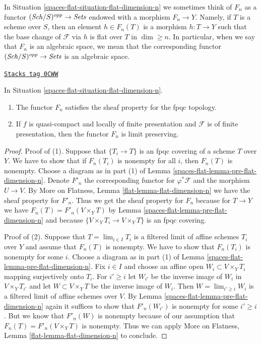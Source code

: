 In Situation \ref{spaces-flat-situation-flat-dimension-n} we sometimes think of
$F_n$ as a functor $(\mathit{Sch}/S)^{opp} \to \textit{Sets}$ endowed with a morphism
$F_n \to Y$. Namely, if $T$ is a scheme over $S$, then
an element $h \in F_n(T)$ is a morphism $h : T \to Y$
such that the base change of $\mathcal{F}$ via $h$ is flat over $T$
in $\dim \geq n$. In particular, when we say
that $F_n$ is an algebraic space, we mean that the corresponding
functor $(\mathit{Sch}/S)^{opp} \to \textit{Sets}$ is an algebraic space.

\begin{lemma}
\label{spaces-flat-lemma-flat-dimension-n}
\href{https://stacks.math.columbia.edu/tag/0CWW}{\texttt{Stacks tag 0CWW}}

In Situation \ref{spaces-flat-situation-flat-dimension-n}.
\begin{enumerate}
\item The functor $F_n$ satisfies the sheaf property for the fpqc topology.
\item If $f$ is quasi-compact and locally of finite presentation
and $\mathcal{F}$ is of finite presentation, then the functor $F_n$ is
limit preserving.
\end{enumerate}
\end{lemma}

\begin{proof}
Proof of (1). Suppose that $\{T_i \to T\}$ is an fpqc covering of
a scheme $T$ over $Y$. We have to show that if $F_n(T_i)$ is nonempty
for all $i$, then $F_n(T)$ is nonempty.
Choose a diagram as in part (1) of Lemma \ref{spaces-flat-lemma-pre-flat-dimension-n}.
Denote $F'_n$ the corresponding functor for
$\varphi^*\mathcal{F}$ and the morphism $U \to V$.
By More on Flatness, Lemma \ref{flat-lemma-flat-dimension-n}
we have the sheaf property for $F'_n$.
Thus we get the sheaf property for $F_n$ because
for $T \to Y$ we have $F_n(T) = F'_n(V \times_Y T)$
by Lemma \ref{spaces-flat-lemma-pre-flat-dimension-n}
and because $\{V \times_Y T_i \to V \times_Y T\}$
is an fpqc covering.

\medskip\noindent
Proof of (2). Suppose that $T = \lim_{i \in I} T_i$ is a filtered limit
of affine schemes $T_i$ over $Y$ and assume that $F_n(T)$ is nonempty.
We have to show that $F_n(T_i)$ is nonempty for some $i$.
Choose a diagram as in
part (1) of Lemma \ref{spaces-flat-lemma-pre-flat-dimension-n}.
Fix $i \in I$ and choose an affine open $W_i \subset V \times_Y T_i$
mapping surjectively onto $T_i$. For $i' \geq i$ let $W_{i'}$
be the inverse image of $W_i$ in $V \times_Y T_{i'}$ and
let $W \subset V \times_Y T$ be the inverse image of $W_i$.
Then $W = \lim_{i' \geq i} W_i$ is a filtered limit of affine
schemes over $V$. By
Lemma \ref{spaces-flat-lemma-pre-flat-dimension-n} again
it suffices to show that $F'_n(W_{i'})$ is nonempty for
some $i' \geq i$. But we know that $F'_n(W)$ is nonempty
because of our assumption that $F_n(T) = F'_n(V \times_Y T)$
is nonempty. Thus we can apply
More on Flatness, Lemma \ref{flat-lemma-flat-dimension-n}
to conclude.
\end{proof}

